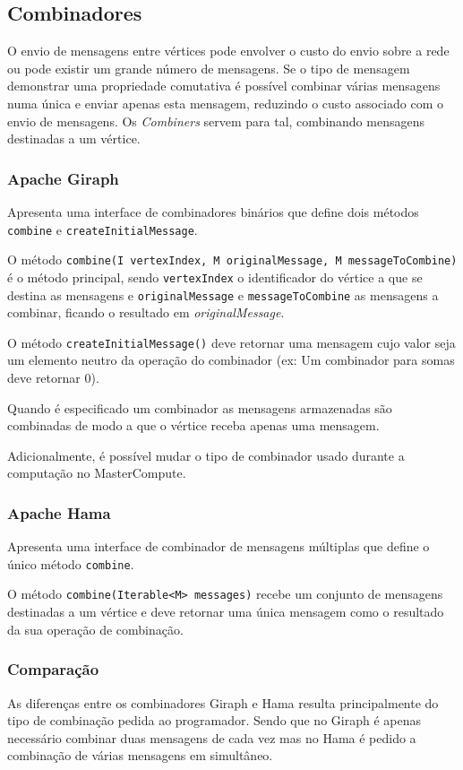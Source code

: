 \newpage
\subsection{Combinadores}
O envio de mensagens entre vértices pode envolver o custo do envio sobre a rede ou pode existir um grande número de mensagens. Se o tipo de mensagem demonstrar uma propriedade comutativa é possível combinar várias mensagens numa única e enviar apenas esta mensagem, reduzindo o custo associado com o envio de mensagens. Os \textit{Combiners} servem para tal, combinando mensagens destinadas a um vértice.

\subsubsection*{Apache Giraph}
Apresenta uma interface de combinadores binários que define dois métodos \texttt{combine} e \texttt{createInitialMessage}.

O método \texttt{combine(I vertexIndex, M originalMessage, M messageToCombine)} é o método principal, sendo \texttt{vertexIndex} o identificador do vértice a que se destina as mensagens e \texttt{originalMessage} e \texttt{messageToCombine} as mensagens a combinar, ficando o resultado em \textsl{originalMessage}.

O método \texttt{createInitialMessage()} deve retornar uma mensagem cujo valor seja um elemento neutro da operação do combinador (ex: Um combinador para somas deve retornar 0).

Quando é especificado um combinador as mensagens armazenadas são combinadas de modo a que o vértice receba apenas uma mensagem.

Adicionalmente, é possível mudar o tipo de combinador usado durante a computação no MasterCompute.
\subsubsection*{Apache Hama}
Apresenta uma interface de combinador de mensagens múltiplas que define o único método \texttt{combine}.

O método \texttt{combine(Iterable<M> messages)} recebe um conjunto de mensagens destinadas a um vértice e deve retornar uma única mensagem como o resultado da sua operação de combinação.


\subsubsection*{Comparação}
As diferenças entre os combinadores Giraph e Hama resulta principalmente do tipo de combinação pedida ao programador. Sendo que no Giraph é apenas necessário combinar duas mensagens de cada vez mas no Hama é pedido a combinação de várias mensagens em simultâneo.

